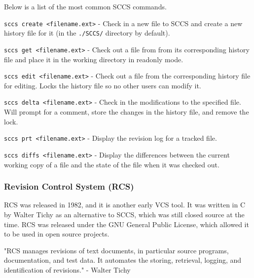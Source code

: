 Below is a list of the most common SCCS commands.

\lstinline{sccs create <filename.ext>} - Check in a new file to SCCS and create a new history file for it (in the \lstinline{./SCCS/} directory by default).

\lstinline{sccs get <filename.ext>} - Check out a file from from its corresponding history file and place it in the working directory in readonly mode.

\lstinline{sccs edit <filename.ext>} - Check out a file from the corresponding history file for editing. Locks the history file so no other users can modify it.

\lstinline{sccs delta <filename.ext>} - Check in the modifications to the specified file. Will prompt for a comment, store the changes in the history file, and remove the lock.

\lstinline{sccs prt <filename.ext>} - Display the revision log for a tracked file.

\lstinline{sccs diffs <filename.ext>} - Display the differences between the current working copy of a file and the state of the file when it was checked out.

\subsubsection{Revision Control System (RCS)}
RCS was released in 1982, and it is another early VCS tool. It was written in C by Walter Tichy as an alternative to SCCS, which was still closed source at the time. RCS was released under the GNU General Public License, which allowed it to be used in open source projects.

"RCS manages revisions of text documents, in particular source programs, documentation, and test data. It automates the storing, retrieval, logging, and identification of revisions." - Walter Tichy
